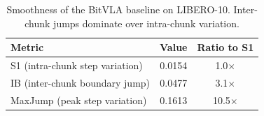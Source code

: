 \begin{table}[t]
\centering
\caption{Smoothness of the BitVLA baseline on LIBERO-10. Inter-chunk jumps dominate over intra-chunk variation.}
\label{tab:baseline_smoothness}
\begin{tabular}{lcc}
\toprule
\textbf{Metric} & \textbf{Value} & \textbf{Ratio to S1} \\
\midrule
S1 (intra-chunk step variation) & 0.0154 & 1.0$\times$ \\
IB (inter-chunk boundary jump) & 0.0477 & 3.1$\times$ \\
MaxJump (peak step variation) & 0.1613 & 10.5$\times$ \\
\bottomrule
\end{tabular}
\end{table}
